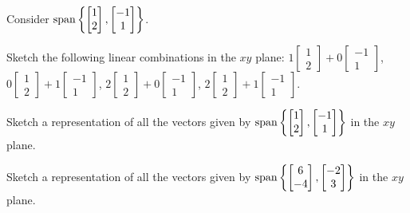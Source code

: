 \begin{applicationActivities}
\begin{activity}{10}
  Consider \(\operatorname{span}\left\{\begin{bmatrix}1\\2\end{bmatrix},
  \begin{bmatrix}-1\\1\end{bmatrix}\right\}\).
  \begin{subactivity}
    Sketch the following linear combinations in the \(xy\) plane:
    \(1\begin{bmatrix}1\\2\end{bmatrix}+
    0\begin{bmatrix}-1\\1\end{bmatrix}\),
    \(0\begin{bmatrix}1\\2\end{bmatrix}+
    1\begin{bmatrix}-1\\1\end{bmatrix}\),
    \(2\begin{bmatrix}1\\2\end{bmatrix}+
    0\begin{bmatrix}-1\\1\end{bmatrix}\),
    \(2\begin{bmatrix}1\\2\end{bmatrix}+
    1\begin{bmatrix}-1\\1\end{bmatrix}\).
  \end{subactivity}
  \begin{subactivity}
    Sketch a representation of all the vectors given by
    \(\operatorname{span}\left\{\begin{bmatrix}1\\2\end{bmatrix},
     \begin{bmatrix}-1\\1\end{bmatrix}\right\}\)
    in the \(xy\) plane.
  \end{subactivity}
\end{activity}

\begin{activity}{5}
    Sketch a representation of all the vectors given by
    \(\operatorname{span}\left\{\begin{bmatrix}6\\-4\end{bmatrix},
     \begin{bmatrix}-2\\3\end{bmatrix}\right\}\)
    in the \(xy\) plane.
\end{activity}


\end{applicationActivities}

